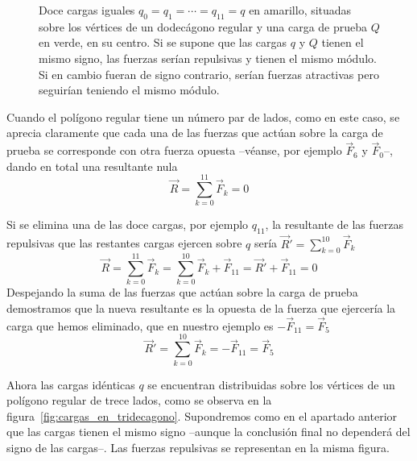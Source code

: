 \documentclass[a4paper,10pt]{article}
\begin{document}
\begin{soluc}
\begin{figure}[ht]
\begin{minipage}{0.45\linewidth}
  \end{minipage}

\caption{Doce cargas iguales $q_{0}= q_{1}= \cdots = q_{11} = q$ en amarillo,
  situadas sobre los vértices de un dodecágono regular y una carga de prueba
  $Q$ en verde, en su centro. Si se supone que las cargas $q$ y $Q$ tienen el
  mismo signo, las fuerzas serían repulsivas y tienen el mismo módulo.
  Si en cambio fueran de signo contrario, serían fuerzas atractivas pero
  seguirían teniendo el mismo módulo.}
\label{fig:cargas_en_dodecagono}
\end{figure}

Cuando el polígono regular tiene un número par de lados, como en este caso,
se aprecia claramente que cada una de las fuerzas que actúan sobre la carga de
prueba se corresponde con otra fuerza opuesta --véanse, por ejemplo
$\vec{F}_{6}$ y $\vec{F}_{0}$--, dando en total una resultante nula
\[
  \vec{R} = \sum_{k=0}^{11} \vec{F}_{k} = 0
\]

\item Si se elimina una de las doce cargas, por ejemplo $q_{11}$, la resultante
  de las fuerzas repulsivas que las restantes cargas ejercen sobre $q$ sería
  $\vec{R}' = \sum_{k=0}^{10} \vec{F}_{k}$
  \[
    \vec{R}
    = \sum_{k=0}^{11} \vec{F}_{k}
    = \sum_{k=0}^{10} \vec{F}_{k} + \vec{F}_{11}
    = \vec{R}' + \vec{F}_{11}
    = 0
  \]
  Despejando la suma de las fuerzas que actúan sobre la carga de prueba
  demostramos que la nueva resultante es la opuesta de la fuerza que ejercería
  la carga que hemos eliminado, que en nuestro ejemplo es
  $-\vec{F}_{11} = \vec{F}_{5}$
  \[
    \vec{R}' = \sum_{k=0}^{10} \vec{F}_{k} = -\vec{F}_{11} = \vec{F}_{5}
  \]
  
\item
  Ahora las cargas idénticas $q$ se encuentran distribuidas sobre los vértices
  de un polígono regular de trece lados, como se observa en la
  figura~\ref{fig:cargas_en_tridecagono}. Supondremos como en el apartado
  anterior que las cargas tienen el mismo signo --aunque la conclusión
  final no dependerá del signo de las cargas--. Las fuerzas repulsivas se
  representan en la misma figura.
  

\end{soluc}
\end{document}

